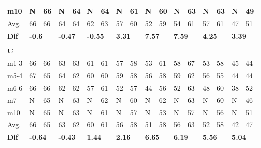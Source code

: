\begin{table}[H]
\begin{tabular}{l|l|l|l|l|l|l|l|l|l|l|l|l|l|l|l|l}
m10  &   N  &     66    &   N    &   64    &     N      &     64      &    N     &     61       &    N     &       60     &      N     &       63     &        N   &       63     & N & 49 \\ \hline
Avg.       &      66 &   66     &      64    &  64     &    62         &     63       &      57      &   60    &     52       &    59        &    54        &      61      &      57      &     61       & 47 &51 \\ \hline
\textbf{Dif} & \multicolumn{2}{l|}{\textbf{-0.6}} & \multicolumn{2}{l|}{\textbf{-0.47}} & \multicolumn{2}{l|}{\textbf{-0.55}} & \multicolumn{2}{l|}{\textbf{3.31}} & \multicolumn{2}{l|}{\textbf{7.57}} & \multicolumn{2}{l|}{\textbf{7.59}}& \multicolumn{2}{l|}{\textbf{4.25}}& \multicolumn{2}{l}{\textbf{3.39}} \\
\multicolumn{17}{l}{ } \\   
\textbf{C} & \multicolumn{2}{l|}{} & \multicolumn{2}{l|}{} & \multicolumn{2}{l|}{} & \multicolumn{2}{l|}{} & \multicolumn{2}{l|}{} & \multicolumn{2}{l|}{}& \multicolumn{2}{l|}{}& \multicolumn{2}{l}{}     \\ \hline
m1-3   &   66  &      66      &    63  &   63         &   61   &     61       &  57   &      58      &  53   &  61   &  58   &      67      &   53   &      58      & 45 &44  \\
m5-4   &    67  &      65      &   64  &     62       &   60    &     60       &  59  &      58      &  56  &  58   &   59  &        62    &   56  &      55      & 44 &44  \\
m6-6   &    66   &     66       &  62  &     62       &    57   &      61      &  52   &       57     &   44  & 56   &   52   &      63      &   48 &       60     & 38 & 52 \\
m7   &   N    &     65       &  N  &    63        & N   &      62      &  N   &      60      & N & 62   &   N   &      63      &   N   &    60        & N & 46 \\
m10  &  N   &      65      &   N  &    63        &  N  &      61      &   N  &       57    &  N  &  53 &  N   &     57       &   N  &      56      & N &  51\\ \hline
Avg.      &   66    &      65      &     63   &     62      &      60&   61      &       56  &     58       &   51   &  58     &  56     &   63         &      52      &    58        & 42 &47 \\ \hline
\textbf{Dif} & \multicolumn{2}{l|}{\textbf{-0.64}} & \multicolumn{2}{l|}{\textbf{-0.43}} & \multicolumn{2}{l|}{\textbf{1.44}} & \multicolumn{2}{l|}{\textbf{2.16}} & \multicolumn{2}{l|}{\textbf{6.65}} & \multicolumn{2}{l|}{\textbf{6.19}}& \multicolumn{2}{l|}{\textbf{5.56}}& \multicolumn{2}{l}{\textbf{5.04}} \\

\end{tabular}
\end{table}
